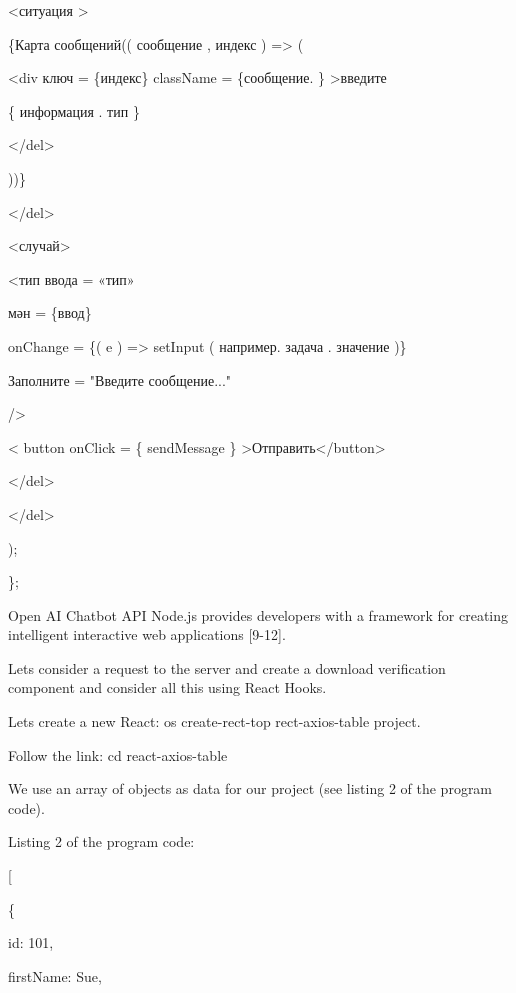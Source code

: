 \textless ситуация \textgreater{}

\{Карта сообщений(( сообщение , индекс ) =\textgreater{} (

\textless div ключ = \{индекс\} className = \{сообщение. \}
\textgreater введите

\{ информация . тип \}

\textless/del\textgreater{}

))\}

\textless/del\textgreater{}

\textless случай\textgreater{}

\textless тип ввода = «тип»

мән = \{ввод\}

onChange = \{( e ) =\textgreater{} setInput ( например. задача .
значение )\}

Заполните = "Введите сообщение..."

/\textgreater{}

\textless{} button onClick = \{ sendMessage \}
\textgreater Отправить\textless/button\textgreater\hspace{0pt}

\textless/del\textgreater{}

\textless/del\textgreater{}

);

\};

\begin{multicols}{2}

Open AI Chatbot API Node.js provides developers with a framework for
creating intelligent interactive web applications {[}9-12{]}.

Let\textquotesingle s consider a request to the server and create a
download verification component and consider all this using React Hooks.

Let\textquotesingle s create a new React: os create-rect-top
rect-axios-table project.

Follow the link: cd react-axios-table

We use an array of objects as data for our project (see listing 2 of the
program code).

Listing 2 of the program code:

\end{multicols}

{[}

\{

id: 101,

firstName: \textquotesingle Sue\textquotesingle,

